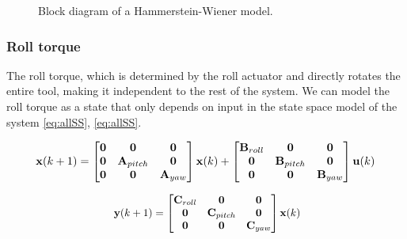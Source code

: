 \begin{figure}[h] 
\caption{Block diagram of a Hammerstein-Wiener model.}
\label{fig:weiner}
\end{figure}

\subsubsection{Roll torque}
The roll torque, which is determined by the roll actuator and directly rotates the entire tool, making it independent to the rest of the system.
We can model the roll torque as a state that only depends on input in the state space model of the system \ref{eq:allSS}, \ref{eq:allSS}.



\begin{equation}\label{eq:allSS}
\resizebox{0.91\hsize}{!}{
$\mathbf{x}(k+1) = 
\begin{bmatrix} \mathbf{0} & \mathbf{0} & \mathbf{0}\\
\mathbf{0} & \mathbf{A}_{pitch} &\mathbf{0}\\
\mathbf{0} &\mathbf{0} & \mathbf{A}_{yaw}  \end{bmatrix} 
\mathbf{x}(k) + 
\begin{bmatrix} \mathbf{B}_{roll} & \mathbf{0} & \mathbf{0}\\
\mathbf{0} & \mathbf{B}_{pitch} &\mathbf{0}\\
\mathbf{0} &\mathbf{0} & \mathbf{B}_{yaw}  \end{bmatrix} 
\mathbf{u}(k)$
}
\end{equation}

\begin{equation}\label{eq:allSS2}
\resizebox{0.5\hsize}{!}{
	$\mathbf{y}(k+1) = 
	\begin{bmatrix} \mathbf{C}_{roll} & \mathbf{0} & \mathbf{0}\\
	\mathbf{0} & \mathbf{C}_{pitch} &\mathbf{0}\\
	\mathbf{0} &\mathbf{0} & \mathbf{C}_{yaw}  \end{bmatrix} 
	\mathbf{x}(k) $}
\end{equation}


